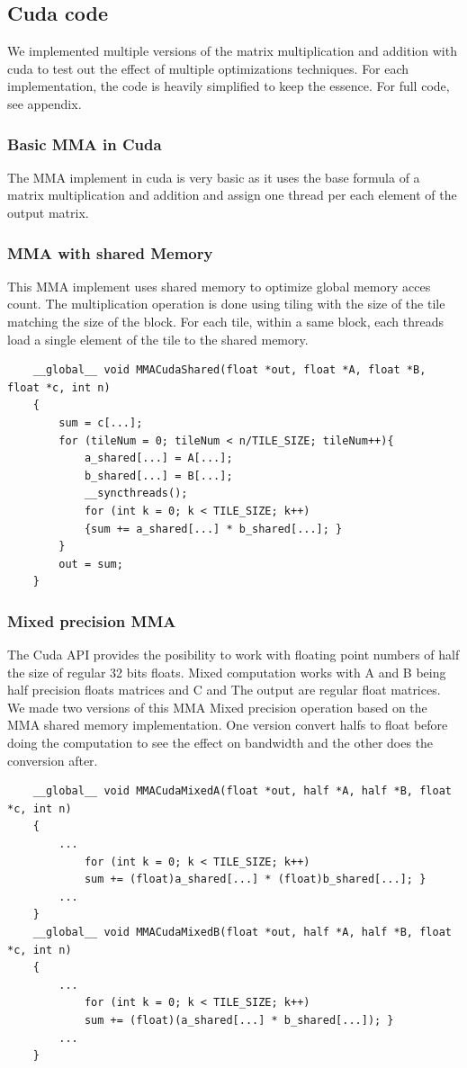 \documentclass[conference]{IEEEtran}
\begin{document}
  \subsection{Cuda code}\label{sec:CudaCode}
  We implemented multiple versions of the matrix multiplication and addition with cuda to
  test out the effect of multiple optimizations techniques. For each implementation, 
  the code is heavily simplified to keep the essence. For full code, see appendix.

  \subsubsection[short]{Basic MMA in Cuda}
  The MMA implement in cuda is very basic as it uses the base formula of a matrix multiplication
  and addition and assign one thread per each element of the output matrix.\cite{Cpp_programming}


  \subsubsection[short]{MMA with shared Memory}
  This MMA implement uses shared memory to optimize global memory acces count. The multiplication operation 
  is done using tiling with the size of the tile matching the size of the block. For each tile, within
  a same block, each threads load a single element of the tile to the shared memory. 
  \begin{lstlisting}
    __global__ void MMACudaShared(float *out, float *A, float *B, float *c, int n)
    {   
        sum = c[...];
        for (tileNum = 0; tileNum < n/TILE_SIZE; tileNum++){
            a_shared[...] = A[...];
            b_shared[...] = B[...];
            __syncthreads();
            for (int k = 0; k < TILE_SIZE; k++)
            {sum += a_shared[...] * b_shared[...]; }
        }
        out = sum;
    }   
  \end{lstlisting}

  \subsubsection[short]{Mixed precision MMA}
  The Cuda API provides the posibility to work with floating point numbers of half the size of regular 32 bits floats.
  Mixed computation works with A and B being half precision floats matrices and C and The output are regular float matrices.
  We made two versions of this MMA Mixed precision operation based on the MMA shared memory implementation. One version
  convert halfs to float before doing the computation to see the effect on bandwidth and the other does the conversion after. 
  \begin{lstlisting}
    __global__ void MMACudaMixedA(float *out, half *A, half *B, float *c, int n)
    {   
        ...
            for (int k = 0; k < TILE_SIZE; k++)
            sum += (float)a_shared[...] * (float)b_shared[...]; }
        ...
    }
    __global__ void MMACudaMixedB(float *out, half *A, half *B, float *c, int n)
    {   
        ...
            for (int k = 0; k < TILE_SIZE; k++)
            sum += (float)(a_shared[...] * b_shared[...]); }
        ...
    }
  \end{lstlisting}
\end{document}
